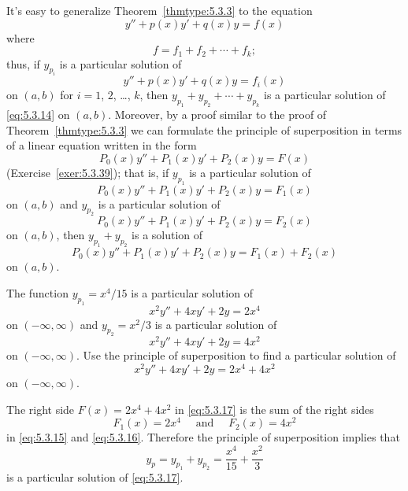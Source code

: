 It's easy to generalize Theorem~\ref{thmtype:5.3.3} to the equation
\begin{equation}
  \label{eq:5.3.14}y''+p(x)y'+q(x)y=f(x)
\end{equation}
where
\[
  f=f_{1}+f_{2}+\cdots+f_{k};
\]
thus, if $y_{p_{i}}$ is a particular solution of
\[
  y''+p(x)y'+q(x)y=f_{i}(x)
\]
on $(a,b)$ for $i=1$, $2$, \dots, $k$, then $y_{p_{1}}+y_{p_{2}}+\cdots+y_{p_{k}}$ is a particular
solution of \eqref{eq:5.3.14} on $(a,b)$. Moreover, by a proof similar to the proof of
Theorem~\ref{thmtype:5.3.3} we can formulate the principle of superposition in terms of a linear
equation written in the form
\[
  P_{0}(x)y''+P_{1}(x)y'+P_{2}(x)y=F(x)
\]
(Exercise~\ref{exer:5.3.39}); that is, if $y_{p_{1}}$ is a particular solution of
\[
  P_{0}(x)y''+P_{1}(x)y'+P_{2}(x)y=F_{1}(x)
\]
on $(a,b)$ and $y_{p_{2}}$ is a particular solution of
\[
  P_{0}(x)y''+P_{1}(x)y'+P_{2}(x)y=F_{2}(x)
\]
on $(a,b)$, then $y_{p_{1}}+y_{p_{2}}$ is a solution of
\[
  P_{0}(x)y''+P_{1}(x)y'+P_{2}(x)y=F_{1}(x)+F_{2}(x)
\]
on $(a,b)$.

\begin{example}
  \label{example:5.3.4} \rm The function $y_{p_{1}}=x^{4}/15$ is a particular solution of
  \begin{equation}
    \label{eq:5.3.15}x^{2}y''+4xy'+2y=2x^{4}
  \end{equation}
  on $(-\infty,\infty)$ and $y_{p_{2}}=x^{2}/3$ is a particular solution of
  \begin{equation}
    \label{eq:5.3.16}x^{2}y''+4xy'+2y=4x^{2}
  \end{equation}
  on $(-\infty,\infty)$. Use the principle of superposition to find a particular solution of
  \begin{equation}
    \label{eq:5.3.17}x^{2}y''+4xy'+2y=2x^{4}+4x^{2}
  \end{equation}
  on $(-\infty,\infty)$.
\end{example}

\begin{examplesolution}
\solution The right side $F(x)=2x^{4}+4x^{2}$ in \eqref{eq:5.3.17} is the sum of the right sides
\[
  F_{1}(x)=2x^{4}\quad\mbox{ and }\quad F_{2}(x)=4x^{2}
\]
in \eqref{eq:5.3.15} and \eqref{eq:5.3.16}. Therefore the principle of superposition implies that
\[
  y_{p}=y_{p_{1}}+y_{p_{2}}=\frac{x^{4}}{15}+\frac{x^{2}}{3}
\]
is a particular solution of \eqref{eq:5.3.17}.
\end{examplesolution}

\exercises

